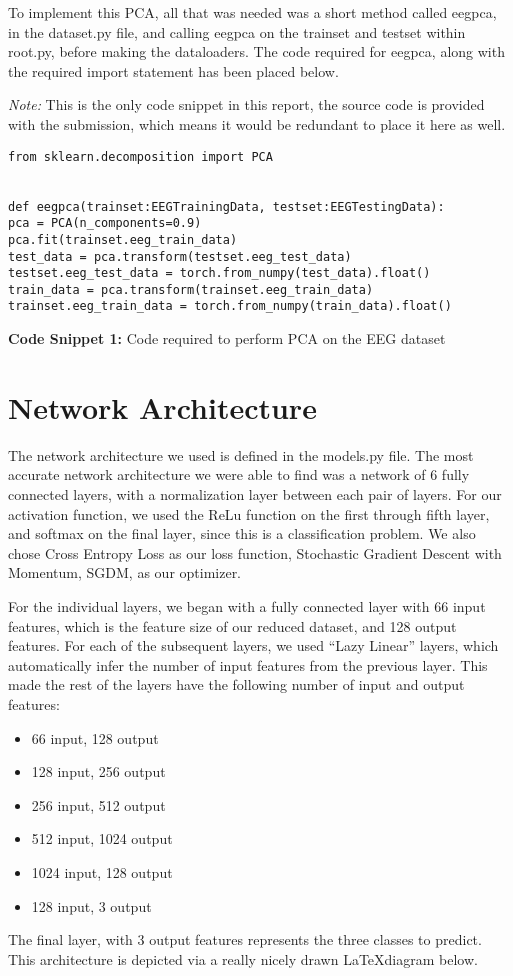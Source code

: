 \documentclass[]{report}
\begin{document}
To implement this PCA, all that was needed was a short method called eegpca, in the dataset.py file, and calling eegpca on the trainset and testset within root.py, before making the dataloaders. The code required for eegpca, along with the required import statement has been placed below. 

\textit{Note:} This is the only code snippet in this report, the source code is provided with the submission, which means it would be redundant to place it here as well.

\begin{center}
	\vspace{1em}
\begin{lstlisting}
from sklearn.decomposition import PCA


def eegpca(trainset:EEGTrainingData, testset:EEGTestingData):
pca = PCA(n_components=0.9)
pca.fit(trainset.eeg_train_data)
test_data = pca.transform(testset.eeg_test_data)
testset.eeg_test_data = torch.from_numpy(test_data).float()
train_data = pca.transform(trainset.eeg_train_data)
trainset.eeg_train_data = torch.from_numpy(train_data).float()
\end{lstlisting}
\textbf{Code Snippet 1:} Code required to perform PCA on the EEG dataset
\end{center}

\newpage

\section*{Network Architecture}

The network architecture we used is defined in the models.py file. The most accurate network architecture we were able to find was a network of 6 fully connected layers, with a normalization layer between each pair of layers. For our activation function, we used the ReLu function on the first through fifth layer, and softmax on the final layer, since this is a classification problem. We also chose Cross Entropy Loss as our loss function, Stochastic Gradient Descent with Momentum, SGDM, as our optimizer.

For the individual layers, we began with a fully connected layer with 66 input features, which is the feature size of our reduced dataset, and 128 output features. For each of the subsequent layers, we used “Lazy Linear” layers, which automatically infer the number of input features from the previous layer. This made the rest of the layers have the following number of input and output features:
\begin{itemize}
	\item 66 input, 128 output
	\item 128 input, 256 output
	\item 256 input, 512 output
	\item 512 input, 1024 output
	\item 1024 input, 128 output
	\item 128 input, 3 output
\end{itemize}
The final layer, with 3 output features represents the three classes to predict. This architecture is depicted via a really nicely drawn \LaTeX diagram below.
\end{document}
